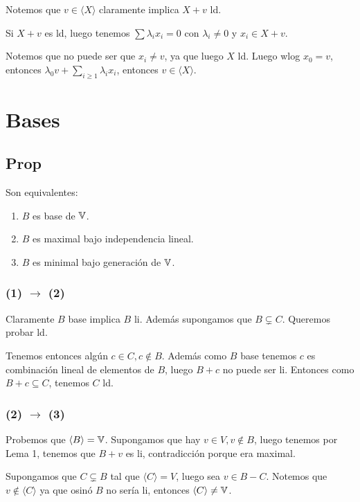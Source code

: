 \documentclass{article}
\begin{document}
Notemos que $v \in \langle X \rangle$ claramente implica $X + v$ ld.

Si $X + v$ es ld, luego tenemos $\sum \lambda_ix_i = 0$ con $\lambda_i \neq 0$ y
$x_i \in X + v$.

Notemos que no puede ser que $x_i \neq v$, ya que luego $X$ ld. Luego wlog $x_0 = v$,
entonces $\lambda_0v + \sum_{i \geq 1} \lambda_i x_i$, entonces $v \in \langle X \rangle$.

\section{Bases}

\subsection{Prop}
Son equivalentes:
\begin{enumerate}
	\item $B$ es base de $\mathbb{V}$.
	\item $B$ es maximal bajo independencia lineal.
	\item $B$ es minimal bajo generación de $\mathbb{V}$.
\end{enumerate}

\subsubsection{(1) $\to$ (2)}
Claramente $B$ base implica $B$ li.
Además supongamos que $B \subsetneq C$. Queremos probar ld.

Tenemos entonces algún $c \in C, c \notin B$. Además como $B$ base tenemos $c$ es
combinación lineal de elementos de $B$, luego $B + c$ no puede ser li. Entonces como
$B + c \subseteq C$, tenemos $C$ ld.

\subsubsection{(2) $\to$ (3)}
Probemos que $\langle B \rangle = \mathbb{V}$. Supongamos que hay $v \in V, v \notin B$, luego
tenemos por Lema 1, tenemos que $B + v$ es li, contradicción porque era maximal.

Supongamos que $C \subsetneq B$ tal que $\langle C \rangle = V$, luego sea $v \in B - C$.
Notemos que $v \notin \langle C \rangle$ ya que osinó $B$ no sería li, entonces
$\langle C \rangle \neq \mathbb{V}$.
\end{document}
